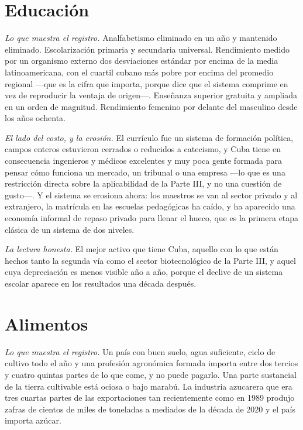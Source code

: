 \section{Educación}

\emph{Lo que muestra el registro.} Analfabetismo eliminado en un año y mantenido
eliminado. Escolarización primaria y secundaria universal. Rendimiento medido por un
organismo externo dos desviaciones estándar por encima de la media latinoamericana,
con el cuartil cubano más pobre por encima del promedio regional ---que es la cifra
que importa, porque dice que el sistema comprime en vez de reproducir la ventaja de
origen---. Enseñanza superior gratuita y ampliada en un orden de magnitud.
Rendimiento femenino por delante del masculino desde los años ochenta.

\emph{El lado del costo, y la erosión.} El currículo fue un sistema de formación
política, campos enteros estuvieron cerrados o reducidos a catecismo, y Cuba tiene
en consecuencia ingenieros y médicos excelentes y muy poca gente formada para pensar
cómo funciona un mercado, un tribunal o una empresa ---lo que es una restricción
directa sobre la aplicabilidad de la Parte III, y no una cuestión de gusto---. Y el
sistema se erosiona ahora: los maestros se van al sector privado y al extranjero, la
matrícula en las escuelas pedagógicas ha caído, y ha aparecido una economía informal
de repaso privado para llenar el hueco, que es la primera etapa clásica de un sistema
de dos niveles.

\emph{La lectura honesta.} El mejor activo que tiene Cuba, aquello con lo que están
hechos tanto la segunda vía como el sector biotecnológico de la Parte III, y aquel
cuya depreciación es menos visible año a año, porque el declive de un sistema
escolar aparece en los resultados una década después.

\section{Alimentos}

\emph{Lo que muestra el registro.} Un país con buen suelo, agua suficiente, ciclo
de cultivo todo el año y una profesión agronómica formada importa entre dos tercios
y cuatro quintas partes de lo que come, y no puede pagarlo.\unv{} Una parte
sustancial de la tierra cultivable está ociosa o bajo marabú. La industria
azucarera que era tres cuartas partes de las exportaciones tan recientemente como
en 1989 produjo zafras de cientos de miles de toneladas a mediados de la década de
2020 y el país importa azúcar.

